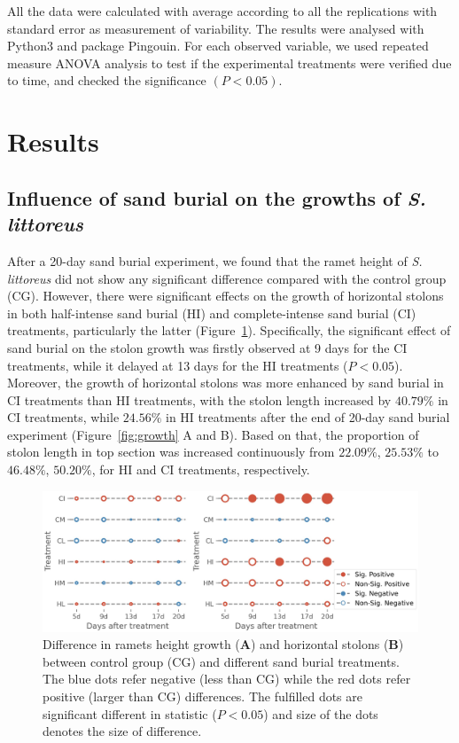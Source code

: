 \documentclass[]{interact}
\theoremstyle{plain}%
\theoremstyle{definition}
\theoremstyle{remark}
\begin{document}
All the data were calculated with average according to all the replications with standard error as measurement of variability. The results were analysed with Python3 and package Pingouin. For each observed variable, we used repeated measure ANOVA analysis to test if the experimental treatments were verified due to time, and checked the significance $(P<0.05)$.

\section{Results}

\subsection{Influence of sand burial on the growths of \textit{S. littoreus}}

After a 20-day sand burial experiment, we found that the ramet height of \textit{S. littoreus} did not show any significant difference compared with the control group (CG). However, there were significant effects on the growth of horizontal stolons in both half-intense sand burial (HI) and complete-intense sand burial (CI) treatments, particularly the latter (Figure~\ref{fig:lattice}). 
Specifically, the significant effect of sand burial on the stolon growth was firstly observed at 9 days for the CI treatments, while it delayed at 13 days for the HI treatments ($P<0.05$).
Moreover, the growth of horizontal stolons was more enhanced by sand burial in CI treatments than HI treatments, with the stolon length increased by $40.79\%$ in CI treatments, while $24.56\%$ in HI treatments after the end of 20-day sand burial experiment (Figure~\ref{fig:growth} A and B).
Based on that, the proportion of stolon length in top section was increased continuously from $22.09\%$, $25.53\%$ to $46.48\%$, $50.20\%$, for HI and CI treatments, respectively.

\begin{figure}[!h]
  \centering
  \includegraphics[scale=0.7]{../figs/grid_differences.jpg}
  \caption{
    Difference in ramets height growth (\textbf{A}) and horizontal stolons (\textbf{B}) between control group (CG) and different sand burial treatments. The blue dots refer negative (less than CG) while the red dots refer positive (larger than CG) differences. The fulfilled dots are significant different in statistic ($P<0.05$) and size of the dots denotes the size of difference.  
  } 
  \label{fig:lattice}
\end{figure}
\end{document}

